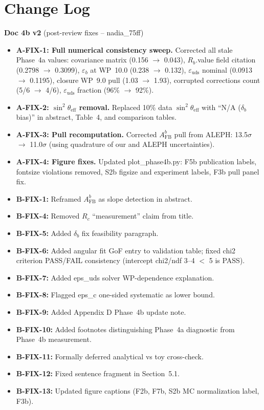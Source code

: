 \documentclass[11pt,a4paper]{article}
\begin{document}
\section*{Change Log}

\textbf{Doc 4b v2} (post-review fixes -- nadia\_75ff)
\begin{itemize}
\item \textbf{A-FIX-1: Full numerical consistency sweep.} Corrected all stale Phase~4a
  values: covariance matrix (0.156 $\to$ 0.043), $R_b$.value field citation (0.2798 $\to$ 0.3099),
  $\varepsilon_b$ at WP~10.0 (0.238 $\to$ 0.132), $\varepsilon_\mathrm{uds}$ nominal
  (0.0913 $\to$ 0.1195), closure WP~9.0 pull (1.03 $\to$ 1.93), corrupted corrections
  count (5/6 $\to$ 4/6), $\varepsilon_\mathrm{uds}$ fraction (96\% $\to$ 92\%).
\item \textbf{A-FIX-2: $\sin^2\theta_\mathrm{eff}$ removal.} Replaced 10\% data
  $\sin^2\theta_\mathrm{eff}$ with ``N/A ($\delta_b$ bias)'' in abstract, Table~4,
  and comparison tables.
\item \textbf{A-FIX-3: Pull recomputation.} Corrected $A_\mathrm{FB}^b$ pull from ALEPH:
  13.5$\sigma$ $\to$ 11.0$\sigma$ (using quadrature of our and ALEPH uncertainties).
\item \textbf{A-FIX-4: Figure fixes.} Updated plot\_phase4b.py: F5b publication labels,
  fontsize violations removed, S2b figsize and experiment labels, F3b pull panel fix.
\item \textbf{B-FIX-1:} Reframed $A_\mathrm{FB}^b$ as slope detection in abstract.
\item \textbf{B-FIX-4:} Removed $R_c$ ``measurement'' claim from title.
\item \textbf{B-FIX-5:} Added $\delta_b$ fix feasibility paragraph.
\item \textbf{B-FIX-6:} Added angular fit GoF entry to validation table; fixed chi2
  criterion PASS/FAIL consistency (intercept chi2/ndf 3--4 $<$ 5 is PASS).
\item \textbf{B-FIX-7:} Added eps\_uds solver WP-dependence explanation.
\item \textbf{B-FIX-8:} Flagged eps\_c one-sided systematic as lower bound.
\item \textbf{B-FIX-9:} Added Appendix D Phase~4b update note.
\item \textbf{B-FIX-10:} Added footnotes distinguishing Phase~4a diagnostic from Phase~4b measurement.
\item \textbf{B-FIX-11:} Formally deferred analytical vs toy cross-check.
\item \textbf{B-FIX-12:} Fixed sentence fragment in Section~5.1.
\item \textbf{B-FIX-13:} Updated figure captions (F2b, F7b, S2b MC normalization label, F3b).
\end{itemize}
\end{document}
